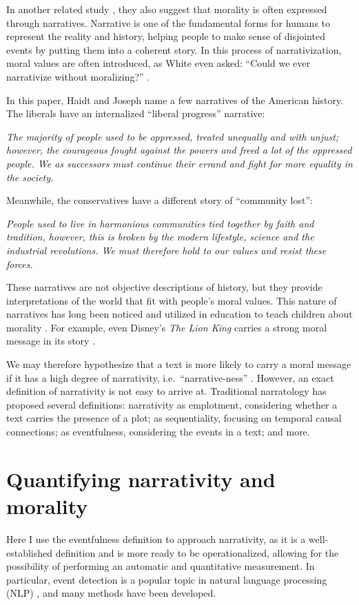 \documentclass[a4paper]{article}
\begin{document}
In another related study \cite{haidt2007moral}, they also suggest that morality is often expressed through narratives. Narrative is one of the fundamental forms for humans to represent the reality and history, helping people to make sense of disjointed events by putting them into a coherent story. In this process of narrativization, moral values are often introduced, as White even asked: ``Could we ever narrativize without moralizing?'' \cite{white1980value}. 

In this paper, Haidt and Joseph name a few narratives of the American history. The liberals have an internalized ``liberal progress'' narrative: 

\emph{The majority of people used to be oppressed, treated unequally and with unjust; however, the courageous fought against the powers and freed a lot of the oppressed people. We as successors must continue their errand and fight for more equality in the society. }

Meanwhile, the conservatives have a different story of ``community lost'':

\emph{People used to live in harmonious communities tied together by faith and tradition, however, this is broken by the modern lifestyle, science and the industrial revolutions. We must therefore hold to our values and resist these forces. }

These narratives are not objective descriptions of history, but they provide interpretations of the world that fit with people's moral values. This nature of narratives has long been noticed and utilized in education to teach children about morality \cite{tappan1991narrative}\cite{tappan1989stories}. For example, even Disney's \emph{The Lion King} carries a strong moral message in its story \cite{ward1996lion}. 

We may therefore hypothesize that a text is more likely to carry a moral message if it has a high degree of narrativity, i.e.~``narrative-ness'' \cite{narrativity}. However, an exact definition of narrativity is not easy to arrive at. Traditional narratology has proposed several definitions: narrativity as emplotment, considering whether a text carries the presence of a plot; as sequentiality, focusing on temporal causal connections; as eventfulness, considering the events in a text; and more.

\section*{Quantifying narrativity and morality}
Here I use the eventfulness definition to approach narrativity, as it is a well-established definition \cite{schmid2003narrativity}\cite{huhn2008functions}\cite{eventfulness} and is more ready to be operationalized, allowing for the possibility of performing an automatic and quantitative measurement. In particular, event detection is a popular topic in natural language processing (NLP) \cite{hogenboom2011overview}\cite{exner2011using}\cite{chambers2009unsupervised}, and many methods have been developed.
\end{document}

